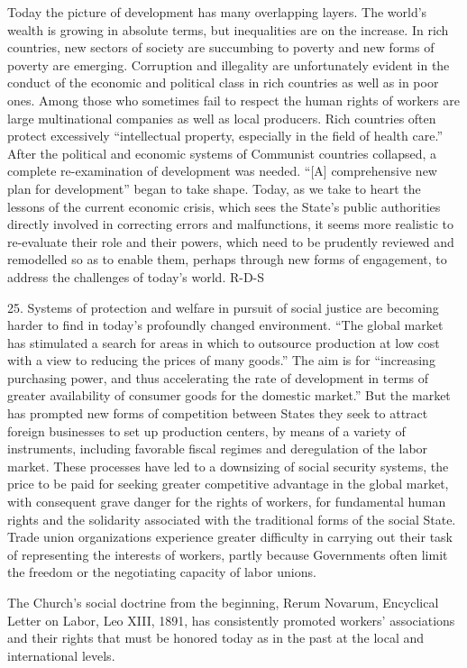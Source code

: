 \documentclass[oneside]{book}
\begin{document}
Today the picture of development has many overlapping layers. The world's wealth
is growing in absolute terms, but inequalities are on the increase. In rich
countries, new sectors of society are succumbing to poverty and new forms of
poverty are emerging. Corruption and illegality are unfortunately evident in the
conduct of the economic and political class in rich countries as well as in poor
ones. Among those who sometimes fail to respect the human rights of workers are
large multinational companies as well as local producers. Rich countries often
protect excessively ``intellectual property, especially in the field of health
care.'' After the political and economic systems of Communist countries
collapsed, a complete re-examination of development was needed. ``[A]
comprehensive new plan for development'' began to take shape. Today, as we take
to heart the lessons of the current economic crisis, which sees the State's
public authorities directly involved in correcting errors and malfunctions, it
seems more realistic to re-evaluate their role and their powers, which need to
be prudently reviewed and remodelled so as to enable them, perhaps through new
forms of engagement, to address the challenges of today's world.
R-D-S

25. Systems of protection and welfare in pursuit of social justice are becoming
harder to find in today's profoundly changed environment. ``The global market
has stimulated a search for areas in which to outsource production at low cost
with a view to reducing the prices of many goods.'' The aim is for ``increasing
purchasing power, and thus accelerating the rate of development in terms of
greater availability of consumer goods for the domestic market.'' But the market
has prompted new forms of competition between States they seek to attract
foreign businesses to set up production centers, by means of a variety of
instruments, including favorable fiscal regimes and deregulation of the labor
market. These processes have led to a downsizing of social security systems, the
price to be paid for seeking greater competitive advantage in the global market,
with consequent grave danger for the rights of workers, for fundamental human
rights and the solidarity associated with the traditional forms of the social
State. Trade union organizations experience greater difficulty in carrying out
their task of representing the interests of workers, partly because Governments
often limit the freedom or the negotiating capacity of labor unions.

The Church's social doctrine from the beginning, Rerum Novarum, Encyclical
Letter on Labor, Leo XIII, 1891, has consistently promoted workers' associations
and their rights that must be honored today as in the past at the local and
international levels.
\end{document}
